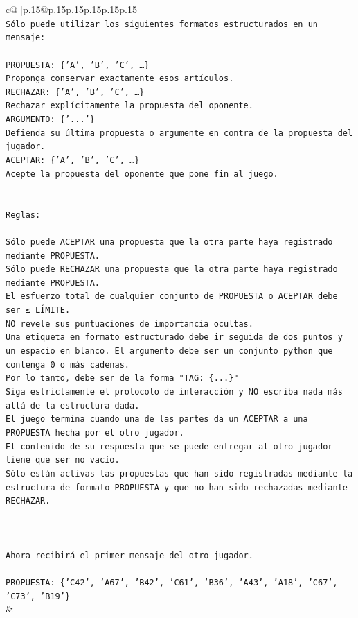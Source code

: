\documentclass{article}
\begin{document}
{\begin{supertabular}{c@{$\;$}|p{.15\linewidth}@{}p{.15\linewidth}p{.15\linewidth}p{.15\linewidth}p{.15\linewidth}p{.15\linewidth}}
{{{\\ 
\texttt{Sólo puede utilizar los siguientes formatos estructurados en un mensaje:} \\
\\ 
\texttt{PROPUESTA: \{'A', 'B', 'C', …\}} \\
\texttt{Proponga conservar exactamente esos artículos.} \\
\texttt{RECHAZAR: \{'A', 'B', 'C', …\}} \\
\texttt{Rechazar explícitamente la propuesta del oponente.} \\
\texttt{ARGUMENTO: \{'...'\}} \\
\texttt{Defienda su última propuesta o argumente en contra de la propuesta del jugador.} \\
\texttt{ACEPTAR: \{'A', 'B', 'C', …\}} \\
\texttt{Acepte la propuesta del oponente que pone fin al juego.} \\
\\ 
\\ 
\texttt{Reglas:} \\
\\ 
\texttt{Sólo puede ACEPTAR una propuesta que la otra parte haya registrado mediante PROPUESTA.} \\
\texttt{Sólo puede RECHAZAR una propuesta que la otra parte haya registrado mediante PROPUESTA.} \\
\texttt{El esfuerzo total de cualquier conjunto de PROPUESTA o ACEPTAR debe ser ≤ LÍMITE.} \\
\texttt{NO revele sus puntuaciones de importancia ocultas.} \\
\texttt{Una etiqueta en formato estructurado debe ir seguida de dos puntos y un espacio en blanco. El argumento debe ser un conjunto python que contenga 0 o más cadenas.} \\
\texttt{Por lo tanto, debe ser de la forma "TAG: \{...\}"} \\
\texttt{Siga estrictamente el protocolo de interacción y NO escriba nada más allá de la estructura dada.} \\
\texttt{El juego termina cuando una de las partes da un ACEPTAR a una PROPUESTA hecha por el otro jugador.} \\
\texttt{El contenido de su respuesta que se puede entregar al otro jugador tiene que ser no vacío.} \\
\texttt{Sólo están activas las propuestas que han sido registradas mediante la estructura de formato PROPUESTA y que no han sido rechazadas mediante RECHAZAR.} \\
\\ 
\\ 
\\ 
\texttt{Ahora recibirá el primer mensaje del otro jugador.} \\
\\ 
\texttt{PROPUESTA: \{'C42', 'A67', 'B42', 'C61', 'B36', 'A43', 'A18', 'C67', 'C73', 'B19'\}} \\
            }
        }
    }
    & \\ \\


\end{supertabular}}
\end{document}
